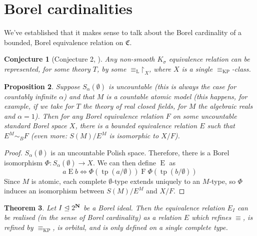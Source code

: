 \documentclass[final,a4paper,12pt]{amsart}
\date{\today}
\newcommand{\fC}{{\mathfrak C}}
\newcommand\Lasc{{\mathrm{L}}}
\newcommand\KP{{\mathrm{KP}}}
\newcommand{\restr}{\mathord{\upharpoonright}}
\DeclareMathOperator{\tp}{{tp}}
\let\unlhd\trianglelefteq
\newtheorem{thm}{Theorem}[section]
\newtheorem{prop}[thm]{Proposition}
\newtheorem{con}[thm]{Conjecture}
\theoremstyle{remark}
\theoremstyle{definition}
\let\Phi\varPhi
\begin{document}
	
	\address{
		Instytut Matematyczny, Uniwersytet Wrocławski,
		pl. Grunwaldzki 2/4, 50-384 Wrocław, Poland
	}
	
	
	
	\author{Tomasz Rzepecki}
	
	
	
	\section{Borel cardinalities}
	We've established that it makes sense to talk about the Borel cardinality of a bounded, Borel equivalence relation on $\fC$.
	
	\begin{con}[Conjecture 2, \cite{KPS13}]
		Any non-smooth $K_\sigma$ equivalence relation can be represented, for some theory $T$, by some $\equiv_{\Lasc}\restr_X$, where $X$ is a single $\equiv_{\KP}$-class.
	\end{con}
	
	\begin{prop}
		Suppose $S_\alpha(\emptyset)$ is uncountable (this is always the case for countably infinite $\alpha$) and that $M$ is a countable atomic model (this happens, for example, if we take for $T$ the theory of real closed fields, for $M$ the algebraic reals and $\alpha=1$). Then for any Borel equivalence relation $F$ on some uncountable standard Borel space $X$, there is a bounded equivalence relation $E$ such that $E^M\sim_B F$ (even more: $S(M)/E^M$ is isomorphic to $X/F$).
	\end{prop}
	\begin{proof}
		$S_\alpha(\emptyset)$ is an uncountable Polish space. Therefore, there is a Borel isomorphism $\Phi\colon S_\alpha(\emptyset)\to X$. We can then define $\mathrel{E}$ as 
		\[
		a\mathrel{E}b\iff \Phi(\tp(a/\emptyset)) \mathrel{F} \Phi(\tp(b/\emptyset))
		\]
		Since $M$ is atomic, each complete $\emptyset$-type extends uniquely to an $M$-type, so $\Phi$ induces an isomorphism between $S(M)/E^M$ and $X/F$.
	\end{proof}
	
	\begin{thm}
		Let $I\unlhd 2^{\bf N}$ be a Borel ideal. Then the equivalence relation $E_I$ can be realised (in the sense of Borel cardinality) as a relation $E$ which refines $\equiv$, is refined by $\equiv_{\KP}$, is orbital, and is only defined on a single complete type.
	\end{thm}
	
\end{document}

